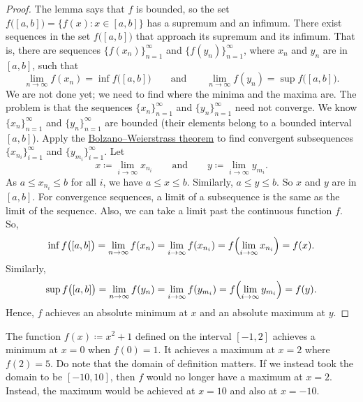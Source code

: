 \begin{proof}
The lemma says that $f$ is bounded, so
the set $f\bigl([a,b]\bigr) = \bigl\{ f(x) : x \in [a,b] \bigr\}$ has a supremum and an infimum.
There exist sequences
in the set $f\bigl([a,b]\bigr)$ that approach its supremum and its infimum.
That is, there are sequences
$\bigl\{ f(x_n) \bigr\}_{n=1}^\infty$ and $\bigl\{ f(y_n)
\bigr\}_{n=1}^\infty$, where $x_n$ and $y_n$ are in $[a,b]$,
such that
\begin{equation*}
\lim_{n\to\infty} f(x_n) = \inf f\bigl([a,b]\bigr) \qquad \text{and} \qquad
\lim_{n\to\infty} f(y_n) = \sup f\bigl([a,b]\bigr).
\end{equation*}
We are not done yet; we need to find where the minima and the maxima are.
The problem is that the sequences $\{ x_n \}_{n=1}^\infty$ and
$\{ y_n \}_{n=1}^\infty$ need not converge.
We know $\{ x_n \}_{n=1}^\infty$ and $\{ y_n \}_{n=1}^\infty$ are bounded
(their elements belong to a bounded interval $[a,b]$).
Apply the 
\hyperref[thm:bwseq]{Bolzano--Weierstrass theorem}
to find
convergent subsequences
$\{ x_{n_i} \}_{i=1}^\infty$ and 
$\{ y_{m_i} \}_{i=1}^\infty$.  Let
\begin{equation*}
x \coloneqq \lim_{i\to\infty} x_{n_i}
\qquad \text{and} \qquad
y \coloneqq \lim_{i\to\infty} y_{m_i}.
\end{equation*}
As $a \leq x_{n_i} \leq b$ for all $i$, we have $a \leq x \leq b$.
Similarly, $a \leq y \leq b$.  So $x$ and $y$ are in $[a,b]$.
For convergence sequences,
a limit of a subsequence is the same as the limit of the
sequence.  Also, we can take a limit past the continuous function $f$.  So,
\begin{equation*}
\inf f\bigl([a,b]\bigr) = \lim_{n\to\infty} f(x_n)
= \lim_{i\to\infty} f(x_{n_i}) = 
f \Bigl( \lim_{i\to\infty} x_{n_i} \Bigr) = f(x) .
\end{equation*}
Similarly,
\begin{equation*}
\sup f\bigl([a,b]\bigr) = \lim_{n\to\infty} f(y_n)
= \lim_{i\to\infty} f(y_{m_i}) = 
f \Bigl( \lim_{i\to\infty} y_{m_i} \Bigr) = f(y) .
\end{equation*}
Hence, $f$ achieves an absolute minimum at $x$ and
an absolute maximum at $y$.
\end{proof}

\begin{example}
The function $f(x) \coloneqq x^2+1$ defined on the interval $[-1,2]$ achieves a minimum
at $x=0$ when $f(0) = 1$.  It achieves a maximum at $x=2$ where $f(2) = 5$.
Do note that the domain of definition matters.  If we instead took the domain
to be $[-10,10]$, then $f$ would no longer have a maximum at $x=2$.
Instead,
the maximum would be achieved at $x=10$ and also at $x=-10$.
\end{example}

